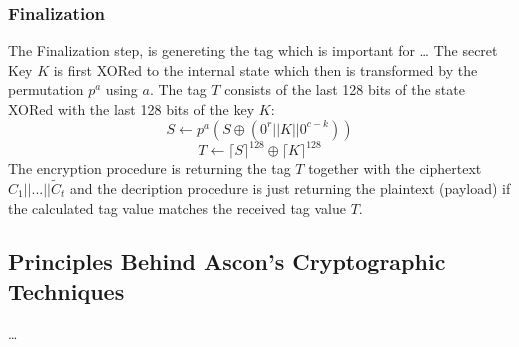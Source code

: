 \subsubsection{Finalization}
The Finalization step, is genereting the tag which is important for \dots
The secret Key $K$ is first XORed to the internal state which then is transformed by the permutation $p^a$ using $a$. The tag $T$ consists of the last 128 bits of the state XORed with the last 128 bits of the key $K$: %
$$S \leftarrow p^a(S \oplus (0^r || K || 0^{c-k}))$$
$$ T \leftarrow \lceil S  \rceil^{128} \oplus \lceil K \rceil^{128}$$
The encryption procedure is returning the tag $T$ together with the ciphertext $C_1||...||\tilde C_t$ and the decription procedure is just returning the plaintext (payload) if the calculated tag value matches the received tag value $T$. \cite{Ascon-v1.2}

\subsection{Principles Behind Ascon's Cryptographic Techniques}
\dots
